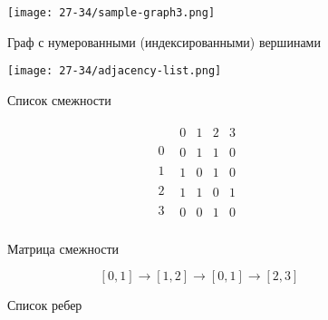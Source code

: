 \begin{figure}
\begin{center}
  \texttt{[image: 27-34/sample-graph3.png]}
  \caption{Граф с нумерованными (индексированными) вершинами}
  \label{fig:graph}
\end{center}
\end{figure}
\begin{figure}
\begin{center}
  \texttt{[image: 27-34/adjacency-list.png]}
  \caption{Список смежности}
  \label{fig:adj-list}
\end{center}
\end{figure}
\begin{figure}
  {\large $$ \begin{array}{c|c}
      & \begin{matrix} 0 & 1 & 2 & 3 \end{matrix} \\\hline
    0 & \begin{matrix} 0 & 1 & 1 & 0 \end{matrix} \\
    1 & \begin{matrix} 1 & 0 & 1 & 0 \end{matrix} \\
    2 & \begin{matrix} 1 & 1 & 0 & 1 \end{matrix} \\
    3 & \begin{matrix} 0 & 0 & 1 & 0 \end{matrix} \\
  \end{array} $$}
  \caption{Матрица смежности}
  \label{fig:adj-mat}
\end{figure}
\begin{figure}
  \begin{center}
    $$[0, 1]\rightarrow[1, 2]\rightarrow[0, 1]\rightarrow[2, 3]$$
  \end{center}
  \caption{Список ребер}
  \label{fig:edg-list}
\end{figure}


